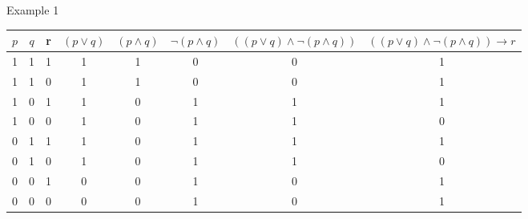 \documentclass[../slides.tex]{subfiles}
\begin{document}
\begin{frame}{Example 1}

\begin{center}
\end{center}

{\tiny
\begin{tabular}{c c c | c | c | c | c | c }
$p$ & $q$  & r & $(p\lor q)$ & $(p\land q)$ &  $\neg (p\land q)$ & $((p\lor q)\land \neg(p\land q))$ & $((p\lor q)\land \neg(p\land q))\to r$ \\\hline

1 & 1 & 1 & 1 &1&0&  0 & 1\\

1 & 1 & 0 & 1 &1&0&  0& 1\\

1 & 0 & 1 & 1 &0&1& 1& 1\\

1 & 0 & 0  & 1 &0& 1&1& 0\\

0 & 1 &  1 & 1 &0& 1 &1 & 1\\

0 & 1 & 0 & 1 &0&1& 1 & 0\\

0 & 0 & 1 & 0 &0& 1 &0& 1\\

0 & 0 & 0 & 0 &0&1 &0& 1

\end{tabular}}

\end{frame}
\end{document}

